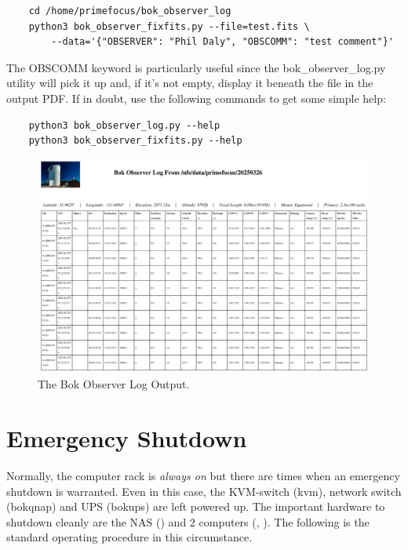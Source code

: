 \documentclass[12pt,twoside]{article}
\begin{document}
\begin{verbatim}
    cd /home/primefocus/bok_observer_log
    python3 bok_observer_fixfits.py --file=test.fits \
        --data='{"OBSERVER": "Phil Daly", "OBSCOMM": "test comment"}'
\end{verbatim}

The OBSCOMM keyword is particularly useful since the bok\_observer\_log.py utility will pick it up and, if it's not 
empty, display it beneath the file in the output PDF. If in doubt, use the following commands to get some simple help:

\begin{verbatim}
    python3 bok_observer_log.py --help
    python3 bok_observer_fixfits.py --help
\end{verbatim}

\begin{figure}[!h]
 \centering
 \includegraphics[width=0.8\linewidth]{bok_observer_log.png}
 \caption{The Bok Observer Log Output.}
 \label{bokol}
\end{figure}

\section{Emergency Shutdown}
\label{Emergency Shutdown}

Normally, the computer rack is \emph{always on} but there are times when an emergency shutdown is warranted. Even in this case, 
the KVM-switch (kvm), network switch (bokqnap) and UPS (bokups) are left powered up. The important hardware to shutdown cleanly 
are the NAS (\sfmagenta{boknas}) and 2 computers (\sfmagenta{bonsai}, \sfmagenta{banzai}). The following is the standard operating
procedure in this circumstance.
\end{document}
